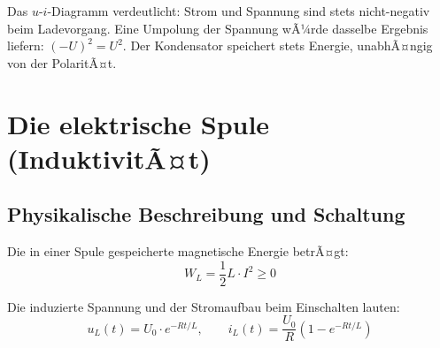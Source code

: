 ﻿\documentclass[12pt, a4paper]{article}
\begin{document}
	Das $u$-$i$-Diagramm verdeutlicht: Strom und Spannung sind stets nicht-negativ beim Ladevorgang. Eine Umpolung der Spannung wÃ¼rde dasselbe Ergebnis liefern: $(-U)^2 = U^2$. Der Kondensator speichert stets Energie, unabhÃ¤ngig von der PolaritÃ¤t.
	
	\section{Die elektrische Spule (InduktivitÃ¤t)}
	
	\subsection{Physikalische Beschreibung und Schaltung}
	
	Die in einer Spule gespeicherte magnetische Energie betrÃ¤gt:
	\begin{equation}
		W_L = \frac{1}{2} L \cdot I^2 \geq 0
		\label{eq:spule_energie}
	\end{equation}
	
	Die induzierte Spannung und der Stromaufbau beim Einschalten lauten:
	\begin{equation}
		u_L(t) = U_0 \cdot e^{-Rt/L}, \qquad
		i_L(t) = \frac{U_0}{R}\left(1 - e^{-Rt/L}\right)
	\end{equation}
	
\end{document}
